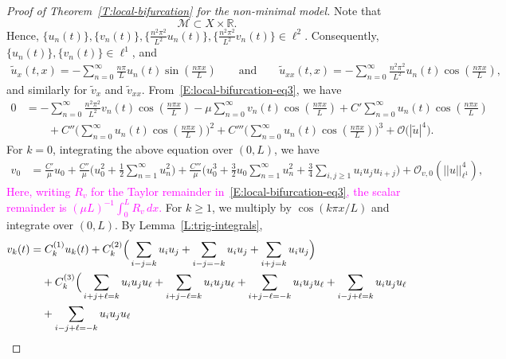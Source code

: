 \documentclass[11pt]{article} %
\newcommand{\norm}[1]{||#1||}
\theoremstyle{remark}
\theoremstyle{remark}
\numberwithin{equation}{section}
\numberwithin{figure}{section}
\numberwithin{table}{section}
\newcommand\RR{\ensuremath{\mathbb{R}}}
\begin{document}
\begin{proof}[Proof of Theorem~\ref{T:local-bifurcation}  for the non-minimal model]
  \smallskip


  Note that
  \[
    \mathcal{M}\subset X\times \RR.
  \]
  Hence, $\{u_n(t)\},\{v_n(t)\},\{\tfrac{n^2\pi^2}{L^2}u_n(t)\},
  \{\tfrac{n^2\pi^2}{L^2}v_n(t)\} \in \ell^2$. Consequently,
  $\{u_n(t)\},\{v_n(t)\} \in \ell^1$, and
  \begin{align*}
    \tilde{u}_x(t,x) =-\sum_{n=0}^\infty \tfrac{n \pi }{L}
    u_n(t)\sin(\tfrac{n\pi x}{L})\qquad\text{and}\qquad
    \tilde{u}_{xx}(t,x) =-\sum_{n=0}^\infty \tfrac{n^2 \pi^2 }{L^2}
    u_n(t)\cos(\tfrac{n\pi x}{L}),
  \end{align*}
  and similarly for $\tilde{v}_x$ and $\tilde{v}_{xx}$.
  From~\eqref{E:local-bifurcation-eq3}, we have
  \begin{align*}
    0 & = -\sum_{n=0}^\infty \frac{n^2\pi^2}{L^2}v_n(t)\cos(\tfrac{n\pi x}{L})
    - \mu\sum_{n=0}^\infty v_n(t)\cos(\tfrac{n\pi x}{L}) + C'\sum_{n=0}^\infty
    u_n(t)\cos(\tfrac{n\pi x}{L}) \\
    &
    \qquad
    +
    C''
    \Big(\sum_{n=0}^\infty
    u_n(t)\cos(\tfrac{n\pi
    x}{L})\Big)^2
    + C'''\Big(\sum_{n=0}^\infty u_n(t)\cos(\tfrac{n\pi x}{L})\Big)^3 +
    \mathcal{O}\big(|\tilde{u}|^4\big).
  \end{align*}
  For $k = 0$, integrating the above equation over $(0, L)$, we have
  \begin{align}\label{E:v0-eq}
    v_0
    &{ =\frac{C'}{\mu}u_0\! +\!\frac{C''}{\mu} \Big(u_0^2+\frac12\sum_{n=1}^\infty
    u_n^2\Big)
    +\frac{C'''}{\mu} \Big( u_0^3+\frac32u_0\sum_{n=1}^\infty\! u_n^2 +\frac34
    \sum_{i,j\ge1}u_i u_j u_{i+j} \Big)
    +\mathcal{O}_{v,0}\left(\norm{u}_{\ell^1}^4\right),}
  \end{align}
  \textcolor{magenta}{Here, writing $R_v$ for the Taylor remainder in~\eqref{E:local-bifurcation-eq3}, the scalar remainder is $(\mu L)^{-1}\int_0^L R_v\,dx$.}
  For $k \ge 1$, we multiply by $\cos\left(k\pi x/L\right)$ and integrate over
  $(0, L)$. By Lemma~\ref{L:trig-integrals},
  \begin{align}\label{E:vk-eq}
    v_k(t)
    = & \;C_k^{(1)}u_k(t)
    +C_k^{(2)}
    \Big(
    \sum_{ i-j =  k } u_i u_j
    + \sum_{ i-j = -k } u_i u_j
    + \sum_{ i+j =  k } u_i u_j
    \Big) \notag \\
    &
    +C_k^{(3)}
    \Big(
    \sum_{ i+j+\ell =  k } u_i u_j u_\ell
    + \sum_{ i+j-\ell =  k } u_i u_j u_\ell
    + \sum_{ i+j-\ell = -k } u_i u_j u_\ell
    + \sum_{ i-j+\ell =  k } u_i u_j u_\ell\notag \\
    &
    + \sum_{ i-j+\ell = -k } u_i u_j u_\ell

\end{align}
\end{proof}
\end{document}
